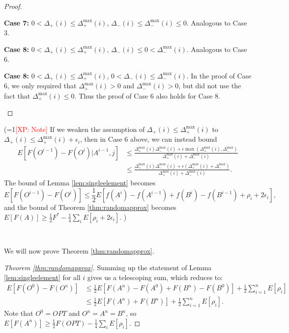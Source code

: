 \documentclass{article} %
\newcommand{\Comments}{1}
\newcommand{\note}[2]{\ifnum\Comments=1\textcolor{#1}{#2}\fi}
\newcommand{\xinghao}[1]{\note{red}{[XP: #1]}}
\begin{document}
\begin{proof}
\begin{description}
\item\textbf{Case 7:} $0 < \Delta_+(i) \leq \Delta_+^{\max}(i)$, $\Delta_-(i) \leq \Delta_-^{\max}(i) \leq 0$.
Analogous to Case 3.

\item\textbf{Case 8:} $0 < \Delta_+(i) \leq \Delta_+^{\max}(i)$, $\Delta_-(i) \leq 0 < \Delta_-^{\max}(i)$.
Analogous to Case 6.

\item\textbf{Case 8:} $0 < \Delta_+(i) \leq \Delta_+^{\max}(i)$, $0 < \Delta_-(i) \leq \Delta_-^{\max}(i)$.
In the proof of Case 6, we only required that $\Delta_+^{\max}(i) > 0$ and $\Delta_-^{\max}(i) > 0$, but did not use the fact that $\Delta_+^{\max}(i) \leq 0$.
Thus the proof of Case 6 also holds for Case 8.

\end{description}
\end{proof}

(\xinghao{Note} If we weaken the assumption of $\Delta_+(i) \leq \Delta_+^{\max}(i)$ to $\Delta_+(i) \leq \Delta_+^{\max}(i) + \epsilon_i$, then in Case 6 above, we can instead bound
\begin{align*}
E[F(O^{i-1})-F(O^i)|A^{i-1}, j]
&\leq \frac{\Delta_+^{\max}(i) \Delta_-^{\max}(i) + \epsilon\max(\Delta_+^{\max}(i), \Delta_-^{\max})}{\Delta_+^{\max}(i) + \Delta_-^{\max}(i)}\\
&\leq \frac{\Delta_+^{\max}(i) \Delta_-^{\max}(i) + \epsilon(\Delta_+^{\max}(i) + \Delta_-^{\max})}{\Delta_+^{\max}(i) + \Delta_-^{\max}(i)}.
\end{align*}
The bound of Lemma \ref{lem:singleelement} becomes
\[E[F(O^{i-1})-F(O^i)] \leq \frac{1}{2} E[f(A^i) - f(A^{i-1}) + f(B^i) - f(B^{i-1}) + \rho_i + 2\epsilon_i],\]
and the bound of Theorem \ref{thm:randomapprox} becomes $E[F(A)] \geq \frac{1}{2} F^* - \frac{1}{4}\sum_iE[\rho_i + 2\epsilon_i]$.
)

~

We will now prove Theorem \ref{thm:randomapprox}.

\begin{proof} [Theorem \ref{thm:randomapprox}]
Summing up the statement of Lemma \ref{lem:singleelement} for all $i$ gives us a telescoping sum, which reduces to:
\begin{align*}
E[F(O^0)-F(O^n)]
&\leq \frac{1}{2} E[F(A^n) - F(A^0) + F(B^n) - F(B^0)] + \frac{1}{2}\sum_{i=1}^nE[\rho_i]\\
&\leq \frac{1}{2} E[F(A^n) + F(B^n)] + \frac{1}{2}\sum_{i=1}^nE[\rho_i].
\end{align*}
Note that $O^0 = OPT$ and $O^n = A^n = B^n$, so $E[F(A^n)] \geq \frac{1}{2} F(OPT) - \frac{1}{4}\sum_iE[\rho_i]$.
\end{proof}
\end{document}
